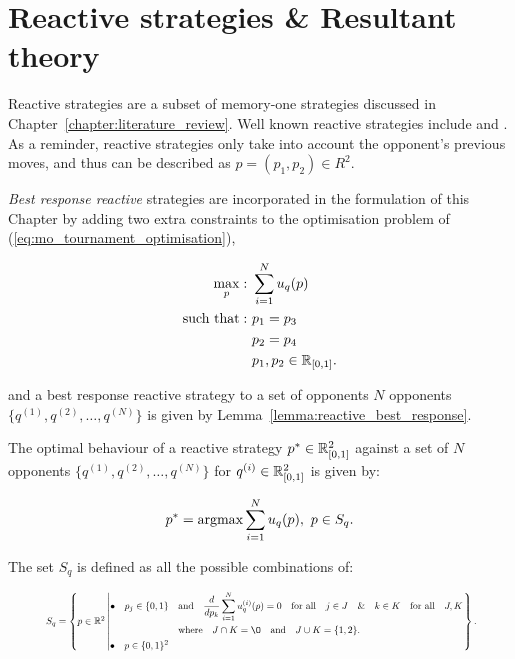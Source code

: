\section{Reactive strategies \& Resultant theory}\label{section:reactive_strategies}

Reactive strategies are a subset of memory-one strategies discussed
in Chapter~\ref{chapter:literature_review}. Well known reactive strategies
include \TitForTat and \GenerousTitForTat. As a reminder, reactive strategies
only take into account the opponent's previous moves, and thus can be described
as \(p = (p_1, p_2) \in R^2\).

\textit{Best response reactive} strategies are incorporated in the formulation of
this Chapter by adding two extra constraints to the
optimisation problem of (\ref{eq:mo_tournament_optimisation}),

\begin{equation}\label{eq:reactive_tournament_optimisation}
\begin{aligned}
\max_p: & \ \sum_{i=1} ^ N u_q(p)
\\
\text{such that}: & \ p_1 = p_3 \\
                  & \ p_2 = p_4\\
                  & \ p_1, p_2 \in \mathbb{R}_{[0, 1]}.
\end{aligned}
\end{equation}

and a best response reactive strategy to a set of opponents \(N\) opponents
\(\{q^{(1)}, q^{(2)}, \dots, q^{(N)} \}\) is given by
Lemma~\ref{lemma:reactive_best_response}.

\begin{lemma}\label{lemma:reactive_best_response}
    The optimal behaviour of a reactive strategy
    \(p^* \in \mathbb{R}_{[0, 1]} ^ 2\)
    against a set of \(N\) opponents \(\{q^{(1)}, q^{(2)}, \dots, q^{(N)} \}\)
    for \(q^{(i)} \in \mathbb{R}_{[0, 1]} ^ 2\) is given by:

    \[p^* = \textnormal{argmax}\sum\limits_{i=1} ^ N  u_q(p), \ p \in S_q.\]

    The set \(S_q\) is defined as all the possible combinations of:
    
    \begin{equation}\label{eq:s_q_reactive_set}
        \resizebox{.9\linewidth}{!}{ $
        S_q =
        \left\{p \in \mathbb{R} ^ 2 \left|
            \begin{aligned}
                \bullet\quad p_j \in \{0, 1\} & \quad \text{and} \quad \frac{d}{dp_k} 
                \sum\limits_{i=1} ^ N  u_q^{(i)}(p) = 0
                \quad \text{for all} \quad j \in J \quad \&  \quad k \in K  \quad \text{for all} \quad J, K \\
                & \quad \text{where} \quad J \cap K = \O \quad
                \text{and} \quad J \cup K = \{1, 2\}.\\
                \bullet\quad  p \in \{0, 1\} ^ 2
            \end{aligned}\right.
        \right\}.
        $}
    \end{equation}
\end{lemma}

